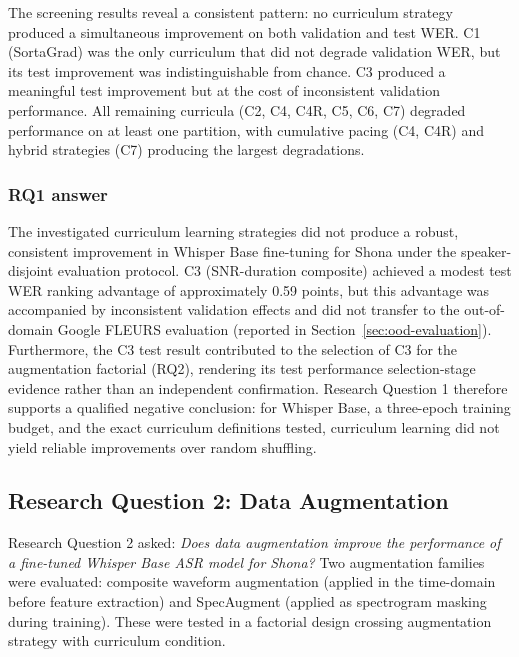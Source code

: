 The screening results reveal a consistent pattern: no curriculum strategy
produced a simultaneous improvement on both validation and test WER. C1
(SortaGrad) was the only curriculum that did not degrade validation WER, but its
test improvement was indistinguishable from chance. C3 produced a meaningful
test improvement but at the cost of inconsistent validation performance. All
remaining curricula (C2, C4, C4R, C5, C6, C7) degraded performance on at least
one partition, with cumulative pacing (C4, C4R) and hybrid strategies (C7)
producing the largest degradations.


\subsubsection{RQ1 answer}

The investigated curriculum learning strategies did not produce a robust,
consistent improvement in Whisper Base fine-tuning for Shona under the
speaker-disjoint evaluation protocol. C3 (SNR-duration composite) achieved a
modest test WER ranking advantage of approximately 0.59 points, but this
advantage was accompanied by inconsistent validation effects and did not transfer
to the out-of-domain Google FLEURS evaluation (reported in
Section~\ref{sec:ood-evaluation}). Furthermore, the C3 test result contributed
to the selection of C3 for the augmentation factorial (RQ2), rendering its test
performance selection-stage evidence rather than an independent confirmation.
Research Question 1 therefore supports a qualified negative conclusion: for
Whisper Base, a three-epoch training budget, and the exact curriculum definitions
tested, curriculum learning did not yield reliable improvements over random
shuffling.


\subsection{Research Question 2: Data Augmentation}
\label{sec:rq2-results}

Research Question 2 asked: \textit{Does data augmentation improve the
performance of a fine-tuned Whisper Base ASR model for Shona?} Two augmentation
families were evaluated: composite waveform augmentation (applied in the
time-domain before feature extraction) and SpecAugment (applied as
spectrogram masking during training). These were tested in a factorial design
crossing augmentation strategy with curriculum condition.


